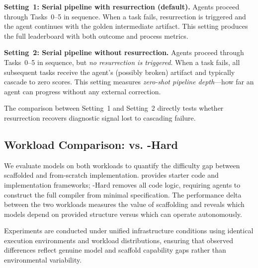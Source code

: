 \textbf{Setting~1: Serial pipeline with resurrection (default).}
Agents proceed through Tasks~0--5 in sequence.
When a task fails, resurrection is triggered and the agent continues with the golden intermediate artifact.
This setting produces the full leaderboard with both outcome and process metrics.

\textbf{Setting~2: Serial pipeline without resurrection.}
Agents proceed through Tasks~0--5 in sequence, but \emph{no resurrection is triggered}.
When a task fails, all subsequent tasks receive the agent's (possibly broken) artifact and typically cascade to zero scores.
This setting measures \emph{zero-shot pipeline depth}---how far an agent can progress without any external correction.

The comparison between Setting~1 and Setting~2 directly tests whether resurrection recovers diagnostic signal lost to cascading failure.

\subsection{Workload Comparison: \yatcc{} vs. \yatcc{}-Hard}

We evaluate models on both workloads to quantify the difficulty gap between scaffolded and from-scratch implementation.
\yatcc{} provides starter code and implementation frameworks; \yatcc{}-Hard removes all code logic, requiring agents to construct the full compiler from minimal specification.
The performance delta between the two workloads measures the value of scaffolding and reveals which models depend on provided structure versus which can operate autonomously.

Experiments are conducted under unified infrastructure conditions using identical execution environments and workload distributions, ensuring that observed differences reflect genuine model and scaffold capability gaps rather than environmental variability.